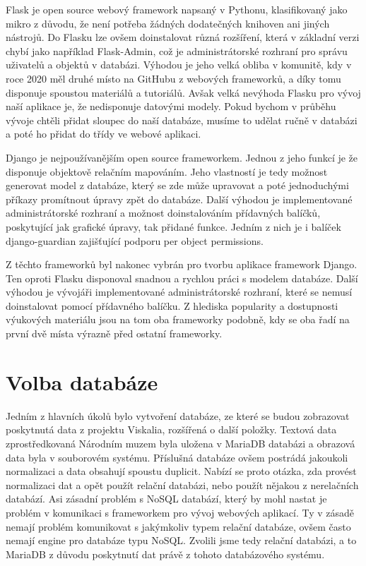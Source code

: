 Flask je open source webový framework napsaný v Pythonu, klasifikovaný
jako mikro z důvodu, že není potřeba žádných dodatečných knihoven ani
jiných nástrojů. Do Flasku lze ovšem doinstalovat různá rozšíření,
která v základní verzi chybí jako například Flask-Admin, což je
administrátorské rozhraní pro správu uživatelů a objektů v
databázi. Výhodou je jeho velká obliba v komunitě, kdy v roce 2020 měl
druhé místo na GitHubu z webových frameworků, a díky tomu disponuje
spoustou materiálů a tutoriálů. Avšak velká nevýhoda Flasku pro vývoj
naší aplikace je, že nedisponuje datovými modely. Pokud bychom v průběhu
vývoje chtěli přidat sloupec do naší databáze, musíme to udělat ručně
v databázi a poté ho přidat do třídy ve webové aplikaci. \cite{flask}

Django je nejpoužívanějším open source frameworkem. Jednou z jeho funkcí je že
disponuje objektově relačním mapováním. Jeho vlastností je tedy možnost generovat
model z databáze, který se zde může upravovat a poté jednoduchými
příkazy promítnout úpravy zpět do databáze. Další výhodou je implementované
administrátorské rozhraní a možnost doinstalováním přídavných balíčků,
poskytující jak grafické úpravy, tak přidané funkce. Jedním z nich je
i balíček django-guardian zajišťující podporu per object permissions. \cite{django}


Z těchto frameworků byl nakonec vybrán pro tvorbu aplikace framework
Django. Ten oproti Flasku disponoval snadnou a rychlou práci s modelem
databáze. Další výhodou je vývojáři implementované administrátorské
rozhraní, které se nemusí doinstalovat pomocí přídavného balíčku. Z
hlediska popularity a dostupnosti výuko\-vých materiálu jsou na tom oba
frameworky podobně, kdy se oba řadí na první dvě místa výrazně před
ostatní frameworky.

\vspace{10px}

\section{Volba databáze}

Jedním z hlavních úkolů bylo vytvoření databáze, ze které se budou
zobrazovat poskytnutá data z projektu Viskalia, rozšířená o další
položky. Textová data zpro\-středkovaná Národním muzem byla uložena v
MariaDB databázi a obrazová data byla v souborovém systému. Příslušná
databáze ovšem postrádá jakoukoli normalizaci a data obsahují spoustu
duplicit. Nabízí se proto otázka, zda provést normalizaci dat a opět
použít relační databázi, nebo použít nějakou z nerelačních
databází. Asi zásadní problém s NoSQL databází, který by mohl nastat
je problém v komunikaci s frameworkem pro vývoj webových aplikací. Ty
v zásadě nemají problém komunikovat s jakýmkoliv typem relační
databáze, ovšem často nemají engine pro databáze typu NoSQL. Zvolili
jsme tedy relační databázi, a to MariaDB z důvodu poskytnutí dat právě
z tohoto databázového systému. \cite{django} \cite{mariadb}

